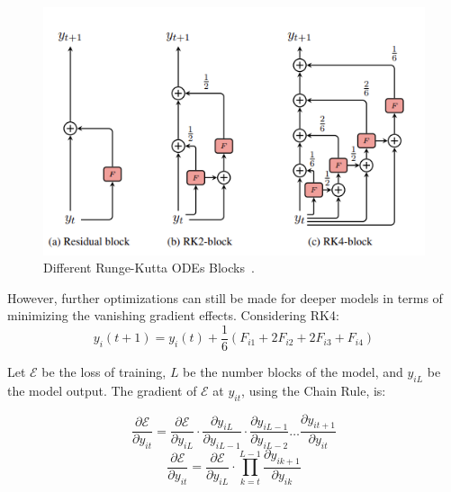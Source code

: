 \documentclass[12pt,a4paper]{report}
\begin{document}
\begin{figure}[th]
  \centering
  \includegraphics[scale=0.64]{./pics/odes.png}
  \caption[Different Runge-Kutta ODEs Blocks]{Different Runge-Kutta ODEs Blocks~\cite{li2022ode}.}
  \label{fig:p9}
\end{figure}

However, further optimizations can still be made for deeper models in terms of minimizing the vanishing gradient effects. Considering RK4:
\begin{equation}
  y_i(t + 1) = y_i(t) + \frac{1}{6}(F_{i1} + 2F_{i2} + 2F_{i3} + F_{i4})\label{eq:3}
\end{equation}

Let $\mathcal{E}$ be the loss of training, $L$ be the number blocks of the model, and $y_{iL}$ be the model output. The gradient of $\mathcal{E}$ at $y_{it}$, using the Chain Rule, is:

\begin{equation}
  \frac{\partial \mathcal{E}}{\partial y_{it}} = \frac{\partial \mathcal{E}}{\partial y_{iL}} \cdot \frac{\partial y_{iL}}{\partial y_{iL-1}} \cdot \frac{\partial y_{iL-1}}{\partial y_{iL-2}} \dots \frac{\partial y_{it+1}}{\partial y_{it}}
\end{equation}
\begin{equation}\label{eq:4}
  \frac{\partial \mathcal{E}}{\partial y_{it}} = \frac{\partial \mathcal{E}}{\partial y_{iL}} \cdot \prod_{k=t}^{L-1} \frac{\partial y_{ik+1}}{\partial y_{ik}}
\end{equation}
\end{document}
